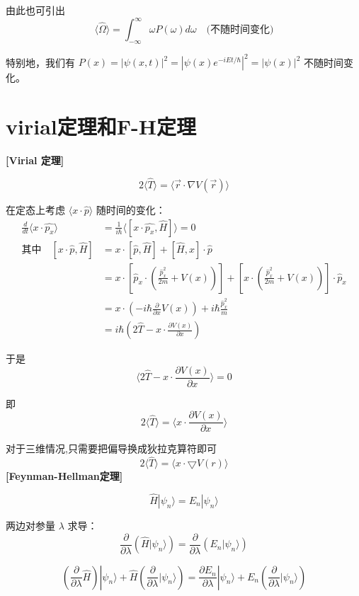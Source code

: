 \documentclass[lang=cn,10pt]{elegantbook}
\begin{document}
\begin{enumerate}
	由此也可引出
	\[
	\langle \hat{\Omega} \rangle = \int_{-\infty}^{\infty} \omega P(\omega) d\omega \quad \text{(不随时间变化)}
	\]
	
	特别地，我们有 $P(x) = |\psi(x,t)|^2 = |\psi(x) e^{-iEt/\hbar}|^2 = |\psi(x)|^2$ 不随时间变化。
\end{enumerate}
\section{virial定理和F-H定理}

\textbf{[Virial 定理]}

\[ 2 \langle \hat{T} \rangle = \langle \vec{r} \cdot \nabla V(\vec{r}) \rangle \]

在定态上考虑 \(\langle x \cdot \hat{p} \rangle\) 随时间的变化：
\begin{align*}
	\frac{d}{dt} \langle x \cdot \hat{p_x} \rangle &= \frac{1}{i\hbar} \langle [x \cdot \hat{p_x}, \hat{H}] \rangle = 0 \\
	\text{其中} \quad [x \cdot \hat{p}, \hat{H}] &= x \cdot [\hat{p}, \hat{H}] + [\hat{H}, x] \cdot \hat{p} \\
	&= x \cdot \left[ \hat{p}_x \cdot \left( \frac{\hat{p}_x^2}{2m} + V(x) \right) \right] + \left[ x \cdot \left( \frac{\hat{p}_x^2}{2m} + V(x) \right) \right] \cdot \hat{p}_x \\
	&= x \cdot \left( -i\hbar \frac{\partial}{\partial x} V(x) \right) + i\hbar \frac{\hat{p}_x^2}{m} \\
	&= i\hbar \left( 2 \hat{T} - x \cdot \frac{\partial V(x)}{\partial x} \right)
\end{align*}

于是
\[ \langle 2 \hat{T} - x \cdot \frac{\partial V(x)}{\partial x} \rangle = 0 \]

即
\[ 2 \langle \hat{T} \rangle = \langle x \cdot \frac{\partial V(x)}{\partial x} \rangle \]

对于三维情况,只需要把偏导换成狄拉克算符即可
\[2\langle \hat{T}\rangle =\langle x\cdot \bigtriangledown V(r)\rangle \]
\textbf{[Feynman-Hellman定理]}

\[
\hat{H} |\psi_n\rangle = E_n |\psi_n\rangle
\]

两边对参量 \(\lambda\) 求导：
\[
\frac{\partial}{\partial \lambda} (\hat{H} |\psi_n\rangle) = \frac{\partial}{\partial \lambda} (E_n |\psi_n\rangle)
\]

\[
\left( \frac{\partial}{\partial \lambda} \hat{H} \right) |\psi_n\rangle + \hat{H} \left( \frac{\partial}{\partial \lambda} |\psi_n\rangle \right) = \frac{\partial E_n}{\partial \lambda} |\psi_n\rangle + E_n \left( \frac{\partial}{\partial \lambda} |\psi_n\rangle \right)
\]
\end{document}
